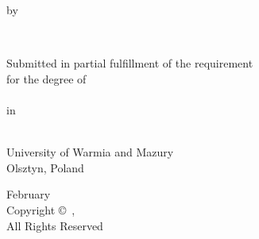 \pagestyle{empty}
\thispagestyle{empty}  %

 
        \begin{center}
        \vspace*{1.0cm}

        \Huge
         

            \begin{center}
              \Huge  \bfseries
              \thesistitlecoverpage
            \end{center}
            \vskip5pt
        \vfill


        \vspace*{1.0cm}

        \normalsize
        by \\

        \vspace*{1.0cm}

        \Large
        \thesisauthor \\

        \vspace*{3.0cm}

        \normalsize
        Submitted in partial fulfillment of the requirement \\
        for the degree of\\
        \degree\\
        in\\
        \nameofprogram

        \vspace*{2.0cm}

       \academicunit\\
        University of Warmia and Mazury\\
        Olsztyn, Poland

        \vspace*{2.0cm}
        February \the\year\\
        Copyright \copyright ~\the\year, \thesisauthor\\
        All Rights Reserved
        \end{center}
 


\pagestyle{plain}
\setcounter{page}{2}

\cleardoublepage %
